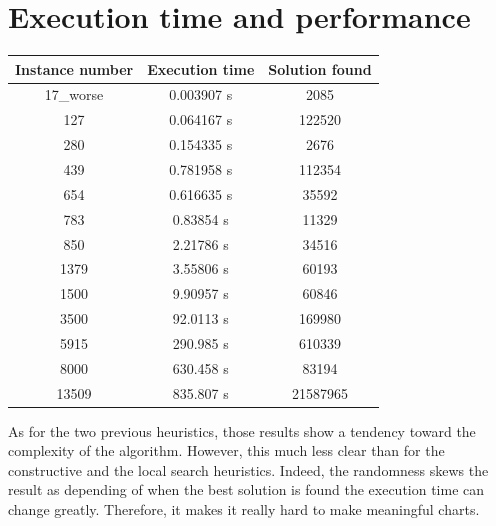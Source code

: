 \documentclass[a4paper, 12pt]{report}
\begin{document}
		\section{Execution time and performance}
		\begin{center}
			\begin{tabular}{|c|c|c|}
				\hline
				Instance number&Execution time&Solution found\\
				\hline
				17\_worse & 0.003907 s & 2085\\
				127 & 0.064167 s & 122520\\
				280 & 0.154335 s & 2676\\
				439 & 0.781958 s & 112354\\
				654 & 0.616635 s & 35592\\
				783 & 0.83854 s & 11329\\
				850 & 2.21786 s & 34516\\
				1379 & 3.55806 s & 60193\\
				1500 & 9.90957 s & 60846\\
				3500 & 92.0113 s & 169980\\
				5915 & 290.985 s & 610339\\
				8000 & 630.458 s & 83194\\
				13509 & 835.807 s & 21587965\\
				\hline
			\end{tabular}
		\end{center}
		As for the two previous heuristics, those results show a tendency toward the complexity of the algorithm. However, this much less clear than for the constructive and the local search heuristics. Indeed, the randomness skews the result as depending of when the best solution is found the execution time can change greatly. Therefore, it makes it really hard to make meaningful charts.
	
\end{document}
